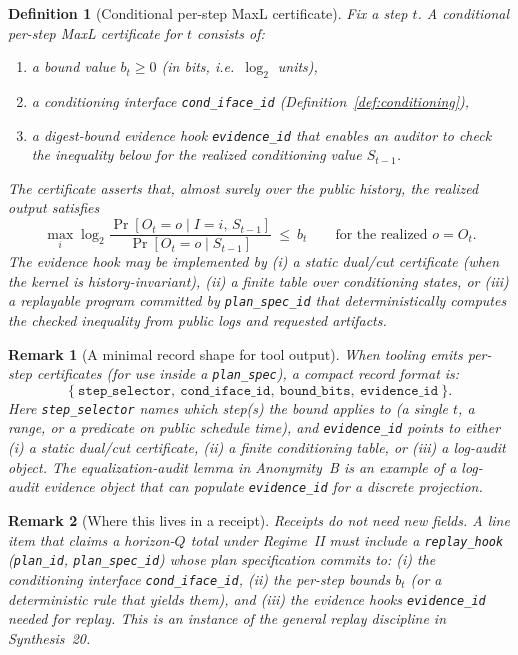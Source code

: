 \documentclass[11pt]{article}
\newtheorem{definition}{Definition}
\newtheorem{remark}{Remark}
\begin{document}
\begin{definition}[Conditional per-step MaxL certificate]\label{def:cps}
Fix a step $t$.
A \emph{conditional per-step MaxL certificate} for $t$ consists of:
\begin{enumerate}[leftmargin=*]
\item a bound value $b_t\ge 0$ (in \emph{bits}, i.e.\ $\log_2$ units),
\item a conditioning interface \texttt{cond\_iface\_id} (Definition~\ref{def:conditioning}),
\item a digest-bound \emph{evidence hook} \texttt{evidence\_id} that enables an auditor to check the inequality below for the realized conditioning value $S_{t-1}$.
\end{enumerate}
The certificate asserts that, almost surely over the public history, the realized output satisfies
\begin{equation}\label{eq:condmaxl}
\max_i \log_2 \frac{\Pr[O_t=o\mid I=i,\,S_{t-1}]}{\Pr[O_t=o\mid S_{t-1}]}\ \le\ b_t
\qquad\text{for the realized }o=O_t.
\end{equation}
The evidence hook may be implemented by (i) a static dual/cut certificate (when the kernel is history-invariant),
(ii) a finite table over conditioning states, or (iii) a replayable program committed by \texttt{plan\_spec\_id} that deterministically computes the checked inequality from public logs and requested artifacts.
\end{definition}

\begin{remark}[A minimal record shape for tool output]
When tooling emits per-step certificates (for use inside a \texttt{plan\_spec}), a compact record format is:
\[
\{\ \texttt{step\_selector},\ \texttt{cond\_iface\_id},\ \texttt{bound\_bits},\ \texttt{evidence\_id}\ \}.
\]
Here \texttt{step\_selector} names which step(s) the bound applies to (a single $t$, a range, or a predicate on public schedule time), and \texttt{evidence\_id} points to either (i) a static dual/cut certificate, (ii) a finite conditioning table, or (iii) a log-audit object.
The equalization-audit lemma in Anonymity~B is an example of a log-audit evidence object that can populate \texttt{evidence\_id} for a discrete projection.\cite{series:profiling}
\end{remark}



\begin{remark}[Where this lives in a receipt]
Receipts do \emph{not} need new fields.
A line item that claims a horizon-$Q$ total under Regime~II must include a \texttt{replay\_hook}
(\texttt{plan\_id}, \texttt{plan\_spec\_id}) whose plan specification commits to:
(i) the conditioning interface \texttt{cond\_iface\_id},
(ii) the per-step bounds $b_t$ (or a deterministic rule that yields them), and
(iii) the evidence hooks \texttt{evidence\_id} needed for replay.
This is an instance of the general replay discipline in Synthesis~20.\cite{series:auditorreplay}
\end{remark}
\end{document}

